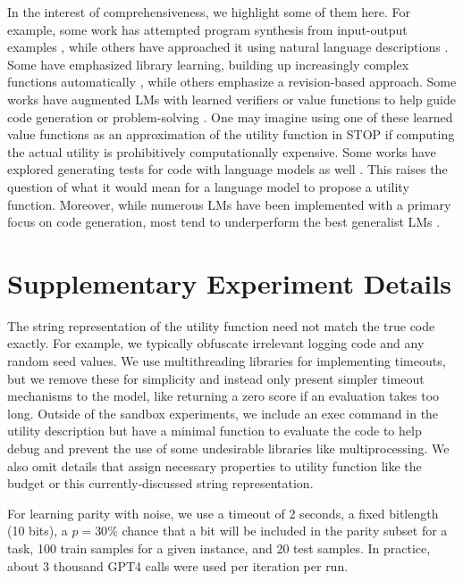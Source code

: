 \documentclass{article} %
\begin{document}
In the interest of comprehensiveness, we highlight some of them here. For example, some work has attempted program synthesis from input-output examples \citep{bauer1979programming,gulwani2016programming,ellis2021dreamcoder,bowers2022top,jain2021jigsaw}, while others have approached it using natural language descriptions \citep{raza2015compositional,yin2017syntactic,desai2016program}. Some have emphasized library learning, building up increasingly complex functions automatically \citep{bowers2022top}, while others emphasize a revision-based approach. Some works have augmented LMs with learned verifiers or value functions to help guide code generation or problem-solving \citep{polu2020generative,cobbe2021training,ni2023lever,zhang2023planning}. One may imagine using one of these learned value functions as an approximation of the utility function in STOP if computing the actual utility is prohibitively computationally expensive. Some works have explored generating tests for code with language models as well \citep{chen2022codet}. This raises the question of what it would mean for a language model to propose a utility function. Moreover, while numerous LMs have been implemented with a primary focus on code generation, most tend to underperform the best generalist LMs \citep{li2022competition,le2022coderl,roziere2023code,austin2021program,xu2022systematic}.

\section{Supplementary Experiment Details}\label{ap:nuances}

The string representation of the utility function need not match the true code exactly. For example, we typically obfuscate irrelevant logging code and any random seed values. We use multithreading libraries for implementing timeouts, but we remove these for simplicity and instead only present simpler timeout mechanisms to the model, like returning a zero score if an evaluation takes too long. Outside of the sandbox experiments, we include an exec command in the utility description but have a minimal function to evaluate the code to help debug and prevent the use of some undesirable libraries like multiprocessing. We also omit details that assign necessary properties to utility function like the budget or this currently-discussed string representation.

For learning parity with noise, we use a timeout of 2 seconds, a fixed bitlength (10 bits), a $p=30\%$ chance that a bit will be included in the parity subset for a task, 100 train samples for a given instance, and 20 test samples. In practice, about 3 thousand GPT4 calls were used per iteration per run.
\end{document}
